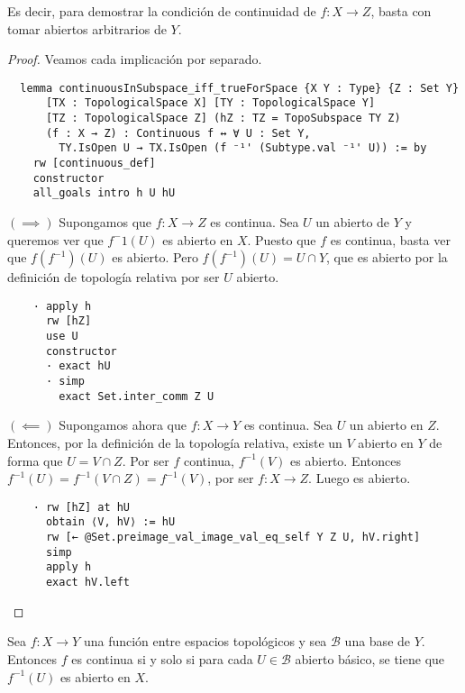 Es decir, para demostrar la condición de continuidad de $f : X \to Z$, basta con tomar abiertos arbitrarios de $Y$.

\begin{proof}
  Veamos cada implicación por separado.

  \begin{lstlisting}
  lemma continuousInSubspace_iff_trueForSpace {X Y : Type} {Z : Set Y}
      [TX : TopologicalSpace X] [TY : TopologicalSpace Y]
      [TZ : TopologicalSpace Z] (hZ : TZ = TopoSubspace TY Z)
      (f : X → Z) : Continuous f ↔ ∀ U : Set Y,
        TY.IsOpen U → TX.IsOpen (f ⁻¹' (Subtype.val ⁻¹' U)) := by
    rw [continuous_def]
    constructor
    all_goals intro h U hU \end{lstlisting}

  $(\implies)$ Supongamos que $f : X \to Z$ es continua. Sea $U$ un abierto de $Y$ y queremos ver que $f^-1(U)$ es abierto en $X$. Puesto que $f$ es continua, basta ver que $f(f^{-1})(U)$ es abierto. Pero $f(f^{-1})(U) = U \cap Y$, que es abierto por la definición de topología relativa por ser $U$ abierto.

  \begin{lstlisting}
    · apply h
      rw [hZ]
      use U
      constructor
      · exact hU
      · simp
        exact Set.inter_comm Z U \end{lstlisting}

  $(\impliedby)$ Supongamos ahora que $f : X \to Y$ es continua. Sea $U$ un abierto en $Z$. Entonces, por la definición de la topología relativa, existe un $V$ abierto en $Y$ de forma que $U = V \cap Z$. Por ser $f$ continua, $f^{-1}(V)$ es abierto. Entonces $f^{-1}(U) = f^{-1}(V \cap Z) = f^{-1}(V)$, por ser $f : X \to Z$. Luego es abierto.

  \begin{lstlisting}
    · rw [hZ] at hU
      obtain ⟨V, hV⟩ := hU
      rw [← @Set.preimage_val_image_val_eq_self Y Z U, hV.right]
      simp
      apply h
      exact hV.left \end{lstlisting}
\end{proof}


\begin{proposition}\label{prop:continuous-base}
  Sea $f : X \to Y$ una función entre espacios topológicos y sea $\mathcal{B}$ una base de $Y$. Entonces $f$ es continua si y solo si para cada $U \in \mathcal{B}$ abierto básico, se tiene que $f^{-1}(U)$ es abierto en $X$.
\end{proposition}


